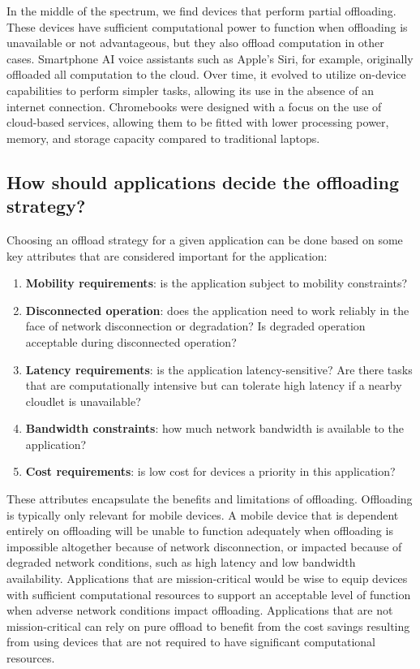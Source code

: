 In the middle of the spectrum, we find devices that perform partial offloading.
These devices have sufficient computational power to function when offloading
is unavailable or not advantageous, but they also offload computation in other
cases. Smartphone AI voice assistants such as Apple's Siri, for example,
originally offloaded all computation to the cloud. Over time, it evolved to
utilize on-device capabilities to perform simpler tasks, allowing its use in
the absence of an internet connection.  Chromebooks were designed with a focus
on the use of cloud-based services, allowing them to be fitted with lower
processing power, memory, and storage capacity compared to traditional laptops.

\subsection{How should applications decide the offloading strategy?}
\label{sec:deciding-offloading-strategy}

Choosing an offload strategy for a given application can be done based on some
key attributes that are considered important for the application:
\begin{enumerate}
    \item \textbf{Mobility requirements}: is the application subject to
        mobility constraints?
    \item \textbf{Disconnected operation}: does the application need to work reliably
        in the face of network disconnection or degradation? Is degraded operation
        acceptable during disconnected operation?
    \item \textbf{Latency requirements}: is the application latency-sensitive?
        Are there tasks that are computationally intensive but can tolerate
        high latency if a nearby cloudlet is unavailable?
    \item \textbf{Bandwidth constraints}: how much network bandwidth is
        available to the application?
    \item \textbf{Cost requirements}: is low cost for devices a priority in
        this application?
\end{enumerate}

These attributes encapsulate the benefits and limitations of offloading.
Offloading is typically only relevant for mobile devices. A mobile device that
is dependent entirely on offloading will be unable to function adequately when
offloading is impossible altogether because of network disconnection, or
impacted because of degraded network conditions, such as high latency and low
bandwidth availability. Applications that are mission-critical would be wise to
equip devices with sufficient computational resources to support an acceptable
level of function when adverse network conditions impact offloading.
Applications that are not mission-critical can rely on pure offload to benefit
from the cost savings resulting from using devices that are not required to
have significant computational resources.

